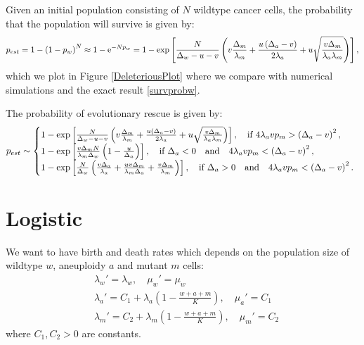 \documentclass[11pt,a4paper]{article}
\newcommand{\e}{{\rm e}}
\begin{document}
Given an initial population consisting of $N$ wildtype cancer cells, the probability that the population will survive is given by: 
\begin{align}\label{pestthirdcase}
p_{est}=1-\left(1-p_w\right)^N\approx 1-\e^{-Np_w}=1-\exp\left[\frac{N}{\Delta_w-u-v}\left(v\frac{\Delta_m}{\lambda_m}+\frac{u\left(\Delta_a-v\right)}{2\lambda_a}+u\sqrt{\frac{v\Delta_m}{\lambda_a\lambda_m}}\right)\right],
\end{align}
which we plot in Figure \ref{DeleteriousPlot} where we compare with numerical simulations and the exact result \eqref{survprobw}.

The probability of evolutionary rescue is given by:
\begin{equation}
p_{est}\sim\left\{
  \begin{array}{@{}ll@{}}
  1-\exp\left[\frac{N}{\Delta_w-u-v}\left(v\frac{\Delta_m}{\lambda_m}+\frac{u\left(\Delta_a-v\right)}{2\lambda_a}+u\sqrt{\frac{v\Delta_m}{\lambda_a\lambda_m}}\right)\right],\quad\text{if }4\lambda_avp_m>\left(\Delta_a-v\right)^2,\\
   1-\exp\left[\frac{v\Delta_mN}{\lambda_m\Delta_w}\left(1-\frac{u}{\Delta_a}\right)\right],\quad\text{if }\Delta_a<0\quad\text{and}\quad4\lambda_avp_m<\left(\Delta_a-v\right)^2,\\
   1-\exp\left[\frac{N}{\Delta_w}\left(\frac{v\Delta_a}{\lambda_a}+\frac{uv\Delta_m}{\lambda_m\Delta_a}+\frac{v\Delta_m}{\lambda_m}\right)\right],\quad\text{if }\Delta_a>0\quad\text{and}\quad4\lambda_avp_m<\left(\Delta_a-v\right)^2.
  \end{array}\right.
\end{equation}
\section{Logistic}
We want to have birth and death rates which depends on the population size of wildtype $w$, aneuploidy $a$ and mutant $m$ cells:
\begin{align*}
&\lambda_w'=\lambda_w,\quad\mu_w'=\mu_w\\
&\lambda_a'=C_1+\lambda_a\left(1-\frac{w+a+m}{K}\right),\quad \mu_a'=C_1\\
&\lambda_m'=C_2+\lambda_m\left(1-\frac{w+a+m}{K}\right),\quad \mu_m'=C_2
\end{align*}
where $C_1, C_2>0$ are constants.
\end{document}
